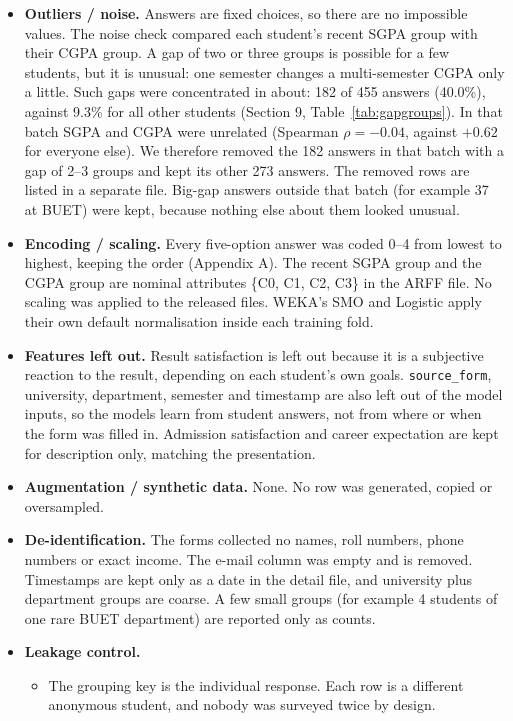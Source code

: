 \documentclass[11pt,a4paper]{article}
\begin{document}
\begin{itemize}
\begin{itemize}
  \end{itemize}
\item \textbf{Outliers / noise.} Answers are fixed choices, so there are no impossible values. The noise check compared each student's recent SGPA group with their CGPA group. A gap of two or three groups is possible for a few students, but it is unusual: one semester changes a multi-semester CGPA only a little. Such gaps were concentrated in about: 182 of 455 answers (40.0\%), against 9.3\% for all other students (Section 9, Table~\ref{tab:gapgroups}). In that batch SGPA and CGPA were unrelated (Spearman $\rho=-0.04$, against $+0.62$ for everyone else). We therefore removed the 182 answers in that batch with a gap of 2--3 groups and kept its other 273 answers. The removed rows are listed in a separate file. Big-gap answers outside that batch (for example 37 at BUET) were kept, because nothing else about them looked unusual.
\item \textbf{Encoding / scaling.} Every five-option answer was coded 0--4 from lowest to highest, keeping the order (Appendix A). The recent SGPA group and the CGPA group are nominal attributes \{C0, C1, C2, C3\} in the ARFF file. No scaling was applied to the released files. WEKA's SMO and Logistic apply their own default normalisation inside each training fold.
\item \textbf{Features left out.} Result satisfaction is left out because it is a subjective reaction to the result, depending on each student's own goals. \texttt{source\_form}, university, department, semester and timestamp are also left out of the model inputs, so the models learn from student answers, not from where or when the form was filled in. Admission satisfaction and career expectation are kept for description only, matching the presentation.
\item \textbf{Augmentation / synthetic data.} None. No row was generated, copied or oversampled.
\item \textbf{De-identification.} The forms collected no names, roll numbers, phone numbers or exact income. The e-mail column was empty and is removed. Timestamps are kept only as a date in the detail file, and university plus department groups are coarse. A few small groups (for example 4 students of one rare BUET department) are reported only as counts.
\item \textbf{Leakage control.}
  \begin{itemize}
  \item The grouping key is the individual response. Each row is a different anonymous student, and nobody was surveyed twice by design.

\end{itemize}
\end{itemize}
\end{document}
